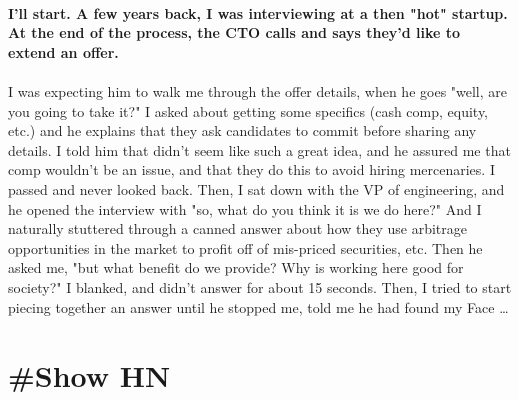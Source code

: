 \documentclass[10pt,a4paper]{article}
\begin{document}
\begin{multicols}{2}
\paragraph{}
\textbf{I'll start.
A few years back, I was interviewing at a then "hot" startup. At the end of the process, the CTO calls and says they'd like to extend an offer.}
\paragraph{}
 I was expecting him to walk me through the offer details, when he goes "well, are you going to take it?" I asked about getting some specifics (cash comp, equity, etc.) and he explains that they ask candidates to commit before sharing any details.
I told him that didn't seem like such a great idea, and he assured me that comp wouldn't be an issue, and that they do this to avoid hiring mercenaries. I passed and never looked back.
Then, I sat down with the VP of engineering, and he opened the interview with "so, what do you think it is we do here?" And I naturally stuttered through a canned answer about how they use arbitrage opportunities in the market to profit off of mis-priced securities, etc. Then he asked me, "but what benefit do we provide? Why is working here good for society?"
I blanked, and didn't answer for about 15 seconds. Then, I tried to start piecing together an answer until he stopped me, told me he had found my Face
\dots\par
\end{multicols}

\newpage
\section{\#Show HN}
\end{document}

